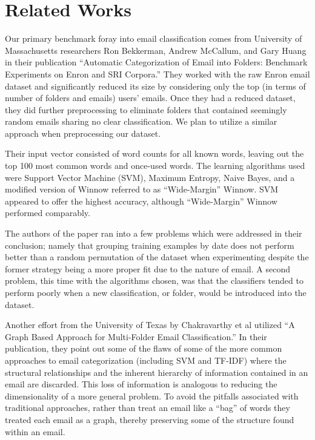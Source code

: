 \documentclass[11pt]{article}
\begin{document}
\section{Related Works}
\label{sec-2}


Our primary benchmark foray into email classification comes from University of Massachusetts researchers Ron Bekkerman, Andrew McCallum, and Gary Huang in their publication “Automatic Categorization of Email into Folders: Benchmark Experiments on Enron and SRI Corpora.”  They worked with the raw Enron email dataset and significantly reduced its size by considering only the top (in terms of number of folders and emails) users' emails. Once they had a reduced dataset, they did further preprocessing to eliminate folders that contained seemingly random emails sharing no clear classification. We plan to utilize a similar approach when preprocessing our dataset.

Their input vector consisted of word counts for all known words, leaving out the top 100 most common words and once-used words. The learning algorithms used were Support Vector Machine (SVM), Maximum Entropy, Naive Bayes, and a modified version of Winnow referred to as “Wide-Margin” Winnow. SVM appeared to offer the highest accuracy, although “Wide-Margin” Winnow performed comparably.

The authors of the paper ran into a few problems which were addressed in their conclusion; namely that grouping training examples by date does not perform better than a random permutation of the dataset when experimenting despite the former strategy being a more proper fit due to the nature of email.  A second problem, this time with the algorithms chosen, was that the classifiers tended to perform poorly when a new classification, or folder, would be introduced into the dataset.

Another effort from the University of Texas by Chakravarthy et al utilized “A Graph Based Approach for Multi-Folder Email Classification.”  In their publication, they point out some of the flaws of some of the more common approaches to email categorization (including SVM and TF-IDF) where the structural relationships and the inherent hierarchy of information contained in an email are discarded.  This loss of information is analogous to reducing the dimensionality of a more general problem.  To avoid the pitfalls associated with traditional approaches, rather than treat an email like a “bag” of words they treated each email as a graph, thereby preserving some of the structure found within an email.
\end{document}
